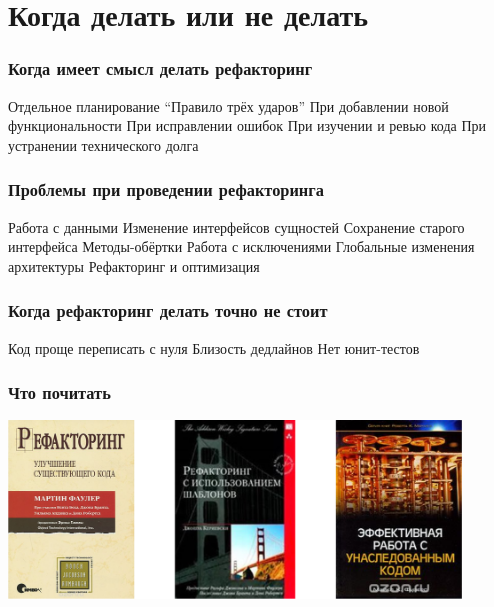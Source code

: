 \documentclass{../../slides-style}
\begin{document}
    \section{Когда делать или не делать}

    \begin{frame}
        \frametitle{Когда имеет смысл делать рефакторинг}
        \begin{outline}
            \1 Отдельное планирование
            \1 ``Правило трёх ударов''
            \1 При добавлении новой функциональности
            \1 При исправлении ошибок
            \1 При изучении и ревью кода
            \1 При устранении технического долга
        \end{outline}
    \end{frame}

    \begin{frame}
        \frametitle{Проблемы при проведении рефакторинга}
        \begin{outline}
            \1 Работа с данными
            \1 Изменение интерфейсов сущностей
                \2 Сохранение старого интерфейса
                \2 Методы-обёртки
                \2 Работа с исключениями
            \1 Глобальные изменения архитектуры
            \1 Рефакторинг и оптимизация
        \end{outline}
    \end{frame}

    \begin{frame}
        \frametitle{Когда рефакторинг делать точно не стоит}
        \begin{outline}
            \1 Код проще переписать с нуля
            \1 Близость дедлайнов
            \1 Нет юнит-тестов
        \end{outline}
    \end{frame}

    \begin{frame}
        \frametitle{Что почитать}
        \begin{center}
            \includegraphics[width=0.9\textwidth]{books.png}
        \end{center}
    \end{frame}
\end{document}
